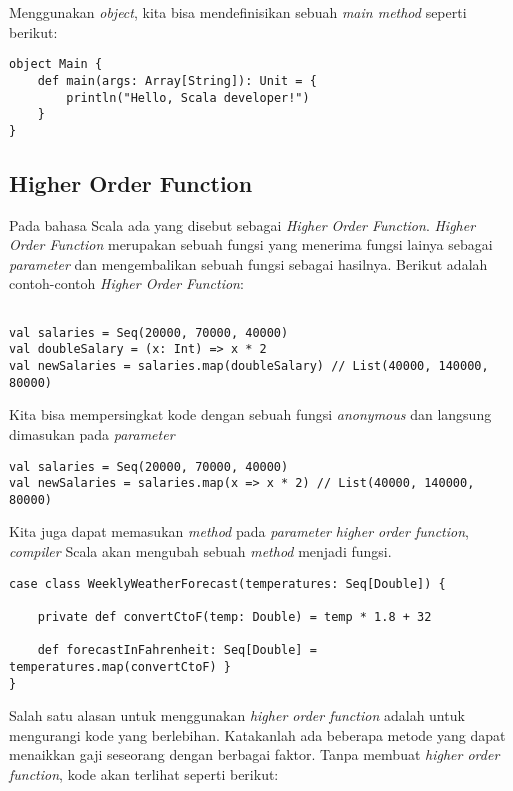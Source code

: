 Menggunakan \textit{object}, kita bisa mendefinisikan sebuah \textit{main method} seperti berikut: 

\begin{verbatim}
object Main {
  	def main(args: Array[String]): Unit = {
        println("Hello, Scala developer!")
    }
}
\end{verbatim}

\subsection{Higher Order Function}

Pada bahasa Scala ada yang disebut sebagai \textit{Higher Order Function}. \textit{Higher Order Function} merupakan sebuah fungsi yang menerima fungsi lainya sebagai \textit{parameter} dan mengembalikan sebuah fungsi sebagai hasilnya. Berikut adalah contoh-contoh \textit{Higher Order Function}:

\begin{verbatim}

val salaries = Seq(20000, 70000, 40000) 
val doubleSalary = (x: Int) => x * 2
val newSalaries = salaries.map(doubleSalary) // List(40000, 140000, 80000)

\end{verbatim}

Kita bisa mempersingkat kode dengan sebuah fungsi \textit{anonymous} dan langsung dimasukan pada \textit{parameter}

\begin{verbatim}
val salaries = Seq(20000, 70000, 40000)
val newSalaries = salaries.map(x => x * 2) // List(40000, 140000, 80000)
\end{verbatim}

Kita juga dapat memasukan \textit{method} pada \textit{parameter} \textit{higher order function}, \textit{compiler} Scala akan mengubah sebuah \textit{method} menjadi fungsi.


\begin{verbatim}
case class WeeklyWeatherForecast(temperatures: Seq[Double]) {

    private def convertCtoF(temp: Double) = temp * 1.8 + 32 

    def forecastInFahrenheit: Seq[Double] = temperatures.map(convertCtoF) } 
}
\end{verbatim}


Salah satu alasan untuk menggunakan \textit{higher order function} adalah untuk mengurangi kode yang berlebihan. Katakanlah ada beberapa metode yang dapat menaikkan gaji seseorang dengan berbagai faktor. Tanpa membuat \textit{higher order function}, kode akan terlihat seperti berikut:

